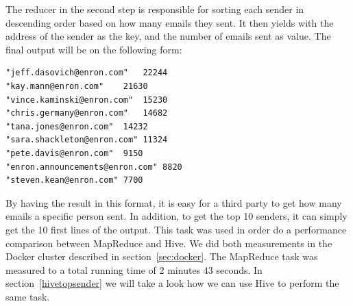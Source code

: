 \documentclass[runningheads,a4paper]{llncs}
\begin{document}
The reducer in the second step is responsible for sorting each sender in descending order based on how many emails they sent. It then yields with the address of the sender as the key, and the number of emails sent as value. The final output will be on the following form:

\begin{verbatim}
"jeff.dasovich@enron.com"	22244
"kay.mann@enron.com"	21630
"vince.kaminski@enron.com"	15230
"chris.germany@enron.com"	14682
"tana.jones@enron.com"	14232
"sara.shackleton@enron.com"	11324
"pete.davis@enron.com"	9150
"enron.announcements@enron.com"	8820
"steven.kean@enron.com"	7700
\end{verbatim}

By having the result in this format, it is easy for a third party to get how many emails a specific person sent. In addition, to get the top 10 senders, it can simply get the 10 first lines of the output.
\newline
\newline
This task was used in order do a performance comparison between MapReduce and Hive.  We did both measurements in the Docker cluster described in section~\ref{sec:docker}.
The MapReduce task was measured to a total running time of $2$ minutes  $43$ seconds. In section~\ref{hivetopsender} we will take a look how we can use Hive to perform the same task.
\end{document}
